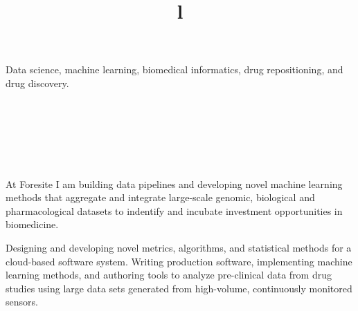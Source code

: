 \begin{resume}



\section{}
Data science, machine learning, biomedical informatics, drug repositioning, and drug discovery.


\section{}
\begin{format}
  \\
  \title{l}\\
  \body\\
\end{format}


\title{\small{}}
\begin{position}
At Foresite I am building data pipelines and developing novel machine learning methods that aggregate and integrate large-scale genomic, biological and pharmacological datasets to indentify and incubate investment opportunities in biomedicine.
\end{position}

\vspace{-0.5em}

\title{\small{}}
\begin{position}
Designing and developing novel metrics, algorithms, and statistical methods for a cloud-based software system.  Writing production software, implementing machine learning methods, and authoring tools to analyze pre-clinical data from drug studies using large data sets generated from high-volume, continuously monitored sensors.
\end{position}


\end{resume}
